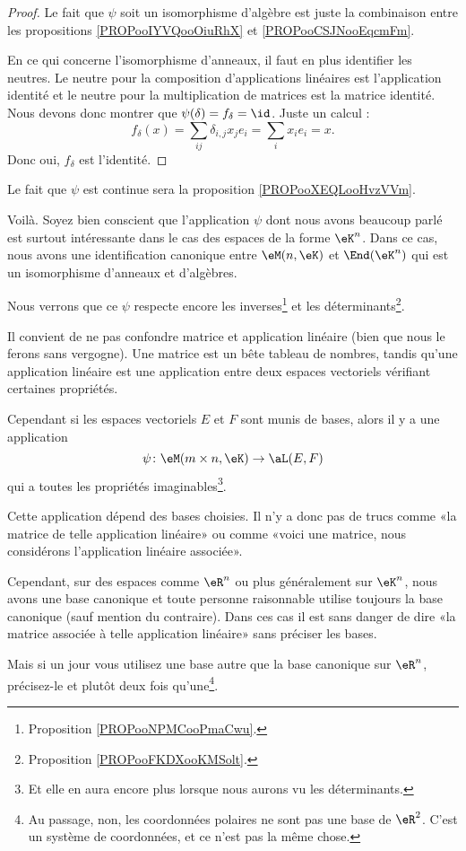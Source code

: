 \begin{proof}
	Le fait que \( \psi\) soit un isomorphisme d'algèbre est juste la combinaison entre les propositions \ref{PROPooIYVQooOiuRhX} et \ref{PROPooCSJNooEqcmFm}.

	En ce qui concerne l'isomorphisme d'anneaux, il faut en plus identifier les neutres. Le neutre pour la composition d'applications linéaires est l'application identité et le neutre pour la multiplication de matrices est la matrice identité. Nous devons donc montrer que \( \psi(\delta)=f_{\delta}=\id\). Juste un calcul :
	\begin{equation}
		f_{\delta}(x)=\sum_{ij}\delta_{i,j}x_je_i=\sum_ix_ie_i=x.
	\end{equation}
	Donc oui, \( f_{\delta}\) est l'identité.
\end{proof}

Le fait que \( \psi\) est continue sera la proposition \ref{PROPooXEQLooHvzVVm}.


Voilà. Soyez bien conscient que l'application \( \psi\) dont nous avons beaucoup parlé est surtout intéressante dans le cas des espaces de la forme \( \eK^n\). Dans ce cas, nous avons une identification canonique entre \( \eM(n,\eK)\) et \( \End(\eK^n)\) qui est un isomorphisme d'anneaux et d'algèbres.

Nous verrons que ce \( \psi\) respecte encore les inverses\footnote{Proposition \ref{PROPooNPMCooPmaCwu}.} et les déterminants\footnote{Proposition \ref{PROPooFKDXooKMSolt}.}.

\begin{normaltext}
	Il convient de ne pas confondre matrice et application linéaire (bien que nous le ferons sans vergogne). Une matrice est un bête tableau de nombres, tandis qu'une application linéaire est une application entre deux espaces vectoriels vérifiant certaines propriétés.

	Cependant si les espaces vectoriels \( E\) et \( F\) sont munis de bases, alors il y a une application
	\begin{equation}
		\psi\colon \eM(m\times n,\eK)\to \aL(E,F)
	\end{equation}
	qui a toutes les propriétés imaginables\footnote{Et elle en aura encore plus lorsque nous aurons vu les déterminants.}.

	Cette application dépend des bases choisies. Il n'y a donc pas de trucs comme «la matrice de telle application linéaire» ou comme «voici une matrice, nous considérons l'application linéaire associée».

	Cependant, sur des espaces comme \( \eR^n\) ou plus généralement sur \( \eK^n\), nous avons une base canonique et toute personne raisonnable utilise toujours la base canonique (sauf mention du contraire). Dans ces cas il est sans danger de dire «la matrice associée à telle application linéaire» sans préciser les bases.

	Mais si un jour vous utilisez une base autre que la base canonique sur \( \eR^n\), précisez-le et plutôt deux fois qu'une\footnote{Au passage, non, les coordonnées polaires ne sont pas une base de \( \eR^2\). C'est un système de coordonnées, et ce n'est pas la même chose.}.
\end{normaltext}


